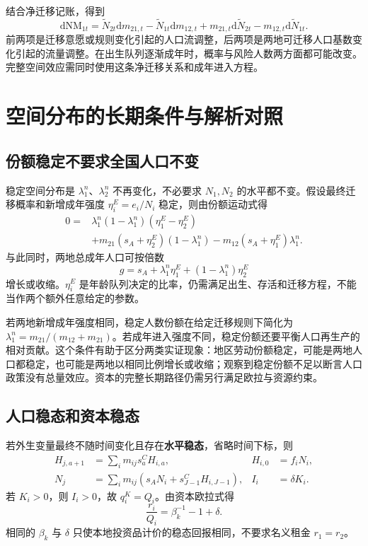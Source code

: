 \documentclass[UTF8,a4paper,zihao=-4,fontset=windows]{ctexart}
\numberwithin{equation}{section}
\newcommand{\invp}{Q}
\newcommand{\dd}{\mathrm{d}}
\begin{document}
结合净迁移记账，得到
\begin{equation}
 \dd\mathrm{NM}_{1t}
 =\widetilde N_{2t}\dd m_{21,t}-\widetilde N_{1t}\dd m_{12,t}
 +m_{21,t}\dd\widetilde N_{2t}-m_{12,t}\dd\widetilde N_{1t}.
 \label{eq:net-migration-differential}
\end{equation}
前两项是迁移意愿或规则变化引起的人口流调整，后两项是两地可迁移人口基数变化引起的流量调整。在出生队列逐渐成年时，概率与风险人数两方面都可能改变。完整空间效应需同时使用这条净迁移关系和成年进入方程。

\section{空间分布的长期条件与解析对照}
\label{sec:steady}

\subsection{份额稳定不要求全国人口不变}
稳定空间分布是 $\lambda^n_1$、$\lambda^n_2$ 不再变化，不必要求 $N_1,N_2$ 的水平都不变。假设最终迁移概率和新增成年强度 $\eta_i^E=e_i/N_i$ 稳定，则由份额运动式得
\begin{align}
 0={}&\lambda^n_1(1-\lambda^n_1)(\eta_1^E-\eta_2^E)\\
 &+m_{21}(s_A+\eta_2^E)(1-\lambda^n_1)
 -m_{12}(s_A+\eta_1^E)\lambda^n_1.
 \label{eq:stable-two-region-share}
\end{align}
与此同时，两地总成年人口可按倍数
\begin{equation}
 g=s_A+\lambda^n_1\eta_1^E+(1-\lambda^n_1)\eta_2^E
 \label{eq:population-growth-with-stable-share}
\end{equation}
增长或收缩。$\eta_i^E$ 是年龄队列决定的比率，仍需满足出生、存活和迁移方程，不能当作两个额外任意给定的参数。

若两地新增成年强度相同，稳定人数份额在给定迁移规则下简化为 $\lambda^n_1=m_{21}/(m_{12}+m_{21})$。若成年进入强度不同，稳定份额还要平衡人口再生产的相对贡献。这个条件有助于区分两类实证现象：地区劳动份额稳定，可能是两地人口都稳定，也可能是两地以相同比例增长或收缩；观察到稳定份额不足以断言人口政策没有总量效应。资本的完整长期路径仍需另行满足欧拉与资源约束。

\subsection{人口稳态和资本稳态}
若外生变量最终不随时间变化且存在\textbf{水平稳态}，省略时间下标，则
\begin{align}
 H_{j,a+1}&=\sum_im_{ij}s^C_aH_{i,a},& H_{i,0}&=f_iN_i,\\
 N_j&=\sum_im_{ij}(s_AN_i+s^C_{J-1}H_{i,J-1}),& I_i&=\delta K_i.
 \label{eq:steady-pop}
\end{align}
若 $K_i>0$，则 $I_i>0$，故 $q^K_i=\invp_i$。由资本欧拉式得
\begin{equation}
 \frac{r_i}{\invp_i}=\beta_k^{-1}-1+\delta.
 \label{eq:steady-return}
\end{equation}
相同的 $\beta_k$ 与 $\delta$ 只使本地投资品计价的稳态回报相同，不要求名义租金 $r_1=r_2$。
\end{document}
